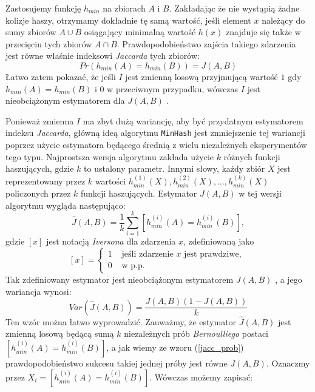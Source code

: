 Zastosujemy funkcję $h_{min}$ na zbiorach $A$ i $B$. Zakładając że nie wystąpią żadne kolizje haszy, otrzymamy dokładnie tę samą wartość, jeśli element $x$ należący do sumy zbiorów $A \cup B$ osiągający minimalną wartość $h(x)$ znajduje się także w przecięciu tych zbiorów $A \cap B$. Prawdopodobieństwo zajścia takiego zdarzenia jest równe właśnie indeksowi \textit{Jaccarda} tych zbiorów:
\begin{equation}
    Pr(h_{min}(A) = h_{min}(B)) = J(A, B)
    \label{jacc_prob}
\end{equation}
Łatwo zatem pokazać, że jeśli $I$ jest zmienną losową przyjmującą wartość $1$ gdy $h_{min}(A) = h_{min}(B)$ i $0$ w przeciwnym przypadku, wówczas $I$ jest nieobciążonym estymatorem dla $J(A, B)$ \cite{minhash}.

Ponieważ zmienna $I$ ma zbyt dużą wariancję, aby być przydatnym estymatorem indeksu \textit{Jaccarda}, główną ideą algorytmu \texttt{MinHash} jest zmniejszenie tej wariancji poprzez użycie estymatora będącego średnią z wielu niezależnych eksperymentów tego typu. Najprostsza wersja algorytmu zakłada użycie $k$ różnych funkcji haszujących, gdzie $k$ to ustalony parametr. Innymi słowy, każdy zbiór $X$ jest reprezentowany przez $k$ wartości $h^{(1)}_{min}(X), h^{(2)}_{min}(X), \ldots, h^{(k)}_{min}(X)$ policzonych przez $k$ funkcji haszujących.
Estymator $J(A, B)$ w tej wersji algorytmu wygląda następująco:
\begin{equation}
    \hat{J}(A, B) = \frac{1}{k}\sum_{i=1}^{k}[h_{min}^{(i)}(A) = h_{min}^{(i)}(B)],
    \label{jacc_est}
\end{equation}
gdzie $[x]$ jest notacją \textit{Iversona} dla zdarzenia $x$, zdefiniowaną jako 
$$[x] = \left\{ \begin{array}{rl}
	1 &\mbox{ jeśli zdarzenie $x$ jest prawdziwe, } \\
	0 &\mbox{ w p.p.}
\end{array} \right.$$ %
Tak zdefiniowany estymator jest nieobciążonym estymatorem $J(A, B)$ \cite{minhash}, a jego wariancja wynosi:
\begin{equation}
    Var(\hat{J}(A,B)) = \frac{J(A, B)(1 - J(A, B))}{k}
    \label{jacc_var}
\end{equation}
Ten wzór można łatwo wyprowadzić. Zauważmy, że estymator $\hat{J}(A, B)$ jest zmienną losową będącą sumą $k$ niezależnych prób \textit{Bernoulliego} postaci $[h_{min}^{(i)}(A) = h_{min}^{(i)}(B)]$, a jak wiemy ze wzoru (\ref{jacc_prob}) prawdopodobieństwo sukcesu takiej jednej próby jest równe $J(A, B)$. Oznaczmy przez $X_i = [h_{min}^{(i)}(A) = h_{min}^{(i)}(B)]$. Wówczas możemy zapisać:
